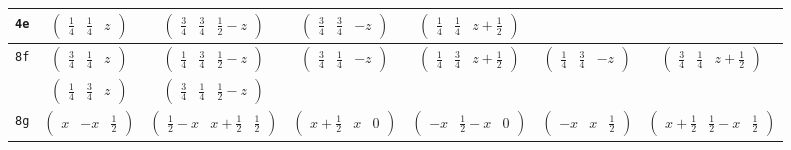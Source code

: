 \documentclass[fleqn,9pt,landscape]{jsarticle}
\begin{document}
\begin{center}
\begin{longtable}{ccccccc}
{\tt 4e} & $ \begin{pmatrix} \frac{1}{4} & \frac{1}{4} & z \end{pmatrix} $ & $ \begin{pmatrix} \frac{3}{4} & \frac{3}{4} & \frac{1}{2} - z \end{pmatrix} $ & $ \begin{pmatrix} \frac{3}{4} & \frac{3}{4} & - z \end{pmatrix} $ & $ \begin{pmatrix} \frac{1}{4} & \frac{1}{4} & z + \frac{1}{2} \end{pmatrix} $ & $  $ & $  $ \\ \hline
{\tt 8f} & $ \begin{pmatrix} \frac{3}{4} & \frac{1}{4} & z \end{pmatrix} $ & $ \begin{pmatrix} \frac{1}{4} & \frac{3}{4} & \frac{1}{2} - z \end{pmatrix} $ & $ \begin{pmatrix} \frac{3}{4} & \frac{1}{4} & - z \end{pmatrix} $ & $ \begin{pmatrix} \frac{1}{4} & \frac{3}{4} & z + \frac{1}{2} \end{pmatrix} $ & $ \begin{pmatrix} \frac{1}{4} & \frac{3}{4} & - z \end{pmatrix} $ & $ \begin{pmatrix} \frac{3}{4} & \frac{1}{4} & z + \frac{1}{2} \end{pmatrix} $ \\
& $ \begin{pmatrix} \frac{1}{4} & \frac{3}{4} & z \end{pmatrix} $ & $ \begin{pmatrix} \frac{3}{4} & \frac{1}{4} & \frac{1}{2} - z \end{pmatrix} $ & $  $ & $  $ & $  $ & $  $ \\ \hline
{\tt 8g} & $ \begin{pmatrix} x & - x & \frac{1}{2} \end{pmatrix} $ & $ \begin{pmatrix} \frac{1}{2} - x & x + \frac{1}{2} & \frac{1}{2} \end{pmatrix} $ & $ \begin{pmatrix} x + \frac{1}{2} & x & 0 \end{pmatrix} $ & $ \begin{pmatrix} - x & \frac{1}{2} - x & 0 \end{pmatrix} $ & $ \begin{pmatrix} - x & x & \frac{1}{2} \end{pmatrix} $ & $ \begin{pmatrix} x + \frac{1}{2} & \frac{1}{2} - x & \frac{1}{2} \end{pmatrix} $ \\

\end{longtable}
\end{center}
\end{document}

